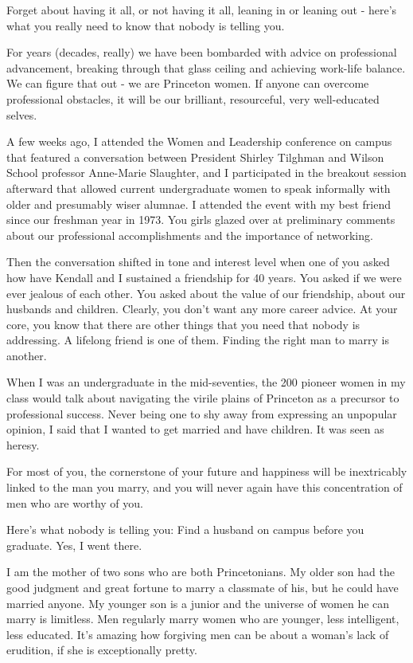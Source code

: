 \bigskip
\begin{linenumbers*}
\modulolinenumbers[5]
\indent Forget about having it all, or not having it all, leaning in or leaning out - here's what you really need to know that nobody is telling you.

\indent For years (decades, really) we have been bombarded with advice on professional advancement, breaking through that glass ceiling and achieving work-life balance. We can figure that out - we are Princeton women. If anyone can overcome professional obstacles, it will be our brilliant, resourceful, very well-educated selves.

\indent A few weeks ago, I attended the Women and Leadership conference on campus that featured a conversation between President Shirley Tilghman and Wilson School professor Anne-Marie Slaughter, and I participated in the breakout session afterward that allowed current undergraduate women to speak informally with older and presumably wiser alumnae. I attended the event with my best friend since our freshman year in 1973. You girls glazed over at preliminary comments about our professional accomplishments and the importance of networking.

\indent Then the conversation shifted in tone and interest level when one of you asked how have Kendall and I sustained a friendship for 40 years. You asked if we were ever jealous of each other. You asked about the value of our friendship, about our husbands and children. Clearly, you don't want any more career advice. At your core, you know that there are other things that you need that nobody is addressing. A lifelong friend is one of them. Finding the right man to marry is another.

\indent When I was an undergraduate in the mid-seventies, the 200 pioneer women in my class would talk about navigating the virile plains of Princeton as a precursor to professional success. Never being one to shy away from expressing an unpopular opinion, I said that I wanted to get married and have children. It was seen as heresy.

\indent For most of you, the cornerstone of your future and happiness will be inextricably linked to the man you marry, and you will never again have this concentration of men who are worthy of you.

\indent Here's what nobody is telling you: Find a husband on campus before you graduate. Yes, I went there.

\indent I am the mother of two sons who are both Princetonians. My older son had the good judgment and great fortune to marry a classmate of his, but he could have married anyone. My younger son is a junior and the universe of women he can marry is limitless. Men regularly marry women who are younger, less intelligent, less educated. It's amazing how forgiving men can be about a woman's lack of erudition, if she is exceptionally pretty.


\end{linenumbers*}
